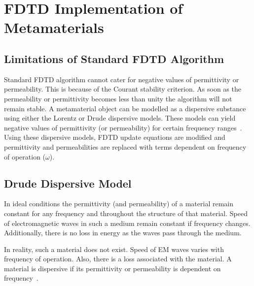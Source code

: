 \chapter{FDTD Implementation of Metamaterials}
\section{Limitations of Standard FDTD Algorithm}
Standard FDTD algorithm cannot cater for negative values of permittivity or permeability. This is because of the Courant stability criterion. As soon as the permeability or permittivity becomes less than unity the algorithm will not remain stable. A metamaterial object can be modelled as a dispersive substance using either the Lorentz or Drude dispersive models. These models can yield negative values of permittivity (or permeability) for certain frequency ranges~\cite{NumericalFDTD-Sibel}. Using these dispersive models, FDTD update equations are modified and permittivity and permeabilities are replaced with terms dependent on frequency of operation ($\omega$).
\section{Drude Dispersive Model}
In ideal conditions the permittivity (and permeability) of a material remain constant for any frequency and throughout the structure of that material. Speed of electromagnetic waves in such a medium remain constant if frequency changes. Additionally, there is no loss in energy as the waves pass through the medium. 

In reality, such a material does not exist. Speed of EM waves varies with frequency of operation. Also, there is a loss associated with the material. A material is dispersive if its permittivity or permeability is dependent on frequency~\cite[Ch. 10]{JBSchneiderUFDTD}.

